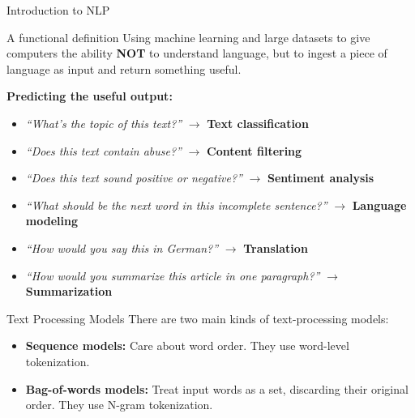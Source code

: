 \documentclass[aspectratio=169]{beamer}
\begin{document}
\begin{frame}{Introduction to NLP}
	\begin{block}{A functional definition}
		Using machine learning and large datasets to give computers the ability \textbf{NOT} to understand language, but to ingest a piece of language as input and return something useful.
	\end{block}
	
	\textbf{Predicting the useful output:}
	\begin{itemize}
		\item \textit{``What’s the topic of this text?''}  $\rightarrow$ \textbf{Text classification}
		\item \textit{``Does this text contain abuse?''}  $\rightarrow$ \textbf{Content filtering}
		\item \textit{``Does this text sound positive or negative?''}  $\rightarrow$ \textbf{Sentiment analysis}
		\item \textit{``What should be the next word in this incomplete sentence?''}  $\rightarrow$ \textbf{Language modeling}
		\item \textit{``How would you say this in German?''}  $\rightarrow$ \textbf{Translation}
		\item \textit{``How would you summarize this article in one paragraph?''}  $\rightarrow$ \textbf{Summarization}
	\end{itemize}
\end{frame}




\begin{frame}{Text Processing Models}
	There are two main kinds of text-processing models:
	\vspace{0.5cm}
	\begin{itemize}
		\item \textbf{Sequence models:} Care about word order. They use word-level tokenization.
		\item \textbf{Bag-of-words models:} Treat input words as a set, discarding their original order. They use N-gram tokenization.
	\end{itemize}
\end{frame}
\end{document}
